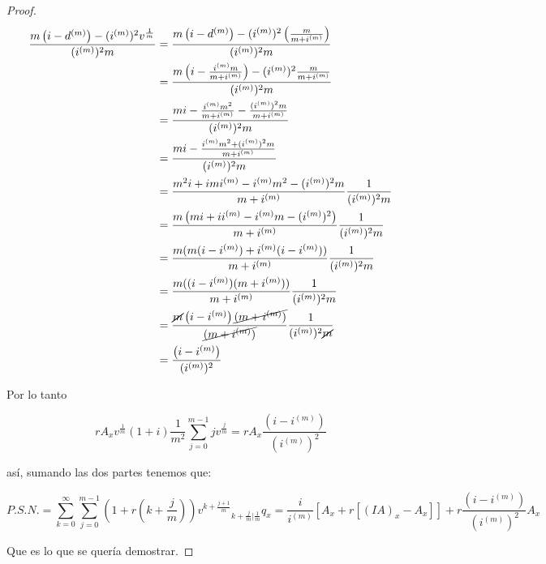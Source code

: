 \begin{proof}
    \begin{align*}
        \frac{m \left( i - d^{(m)} \right) - (i^{(m)})^2 v^{\frac{1}{m}}}{(i^{(m)})^2 m} &= \frac{m \left( i - d^{(m)} \right) - (i^{(m)})^2 \left( \frac{m}{m+i^{(m)}} \right)}{(i^{(m)})^2 m}\\
        &= \frac{m \left( i - \frac{i^{(m)}m}{m+i^{(m)}} \right) - (i^{(m)})^2 \frac{m}{m+i^{(m)}}}{(i^{(m)})^2 m}\\
        &= \frac{mi - \frac{i^{(m)} m^2}{m+i^{(m)}} - \frac{(i^{(m)})^2 m}{m+i^{(m)}}}{(i^{(m)})^2 m}\\
        &= \frac{mi - \frac{i^{(m)} m^2 + (i^{(m)})^2 m}{m+i^{(m)}}}{(i^{(m)})^2 m}\\
        &= \frac{m^2 i + i m i^{(m)} - i^{(m)} m^2 - (i^{(m)})^2 m}{m+i^{(m)}} \frac{1}{(i^{(m)})^2 m}\\
        &= \frac{m \left( m i + i i^{(m)} - i^{(m)} m - (i^{(m)})^2 \right)}{m+i^{(m)}} \frac{1}{(i^{(m)})^2 m}\\
        &= \frac{m(m(i-i^{(m)}) + i^{(m)}(i-i^{(m)}))}{m+i^{(m)}} \frac{1}{(i^{(m)})^2 m}\\
        &= \frac{m((i-i^{(m)})(m+i^{(m)}))}{m+i^{(m)}} \frac{1}{(i^{(m)})^2 m}\\
        &= \frac{\cancel{m} \left( i - i^{(m)} \right) \cancel{(m+i^{(m)})}}{\cancel{(m+i^{(m)})}} \frac{1}{(i^{(m)})^2 \cancel{m}}\\
        &= \frac{\left( i - i^{(m)} \right)}{(i^{(m)})^2}
\end{align*}

    Por lo tanto

    $$r A_x v^{\frac{1}{m}} (1 + i) \frac{1}{m^2} \sum_{j=0}^{m-1} j v^{\frac{j}{m}} = r A_x \frac{\left( i - i^{(m)} \right)}{(i^{(m)})^2}$$

    así, sumando las dos partes tenemos que:

    \begin{equation}
        P.S.N. = \sum_{k=0}^\infty \sum_{j=0}^{m-1} \left(1+r\left(k+\frac{j}{m}\right)\right) v^{k+\frac{j+1}{m}} {}_{k + \frac{j}{m}|\frac{1}{m}} q_x = \frac{i}{i^{(m)}} [A_x + r[(IA)_x - A_x]] + r \frac{\left( i - i^{(m)} \right)}{(i^{(m)})^2} A_x
    \end{equation}

    Que es lo que se quería demostrar.
\end{proof}